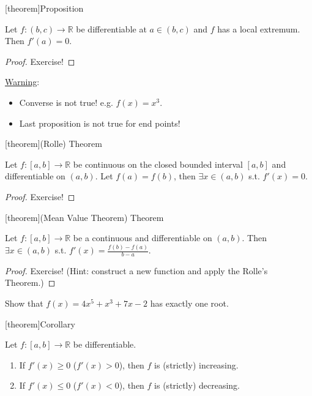 \documentclass[12pt]{report}
\theoremstyle{definition}
\begin{document}
[theorem]{Proposition}
\begin{local extremum differentiated to be 0}
    Let $f:(b,c)\rightarrow{}\mathbb{R}$ be differentiable at $a\in(b,c)$ and 
    $f$ has a local extremum. Then $f'(a) = 0$.
\end{local extremum differentiated to be 0}

\begin{proof}
    Exercise!
\end{proof}

\underline{Warning}:
\begin{itemize}
        \item Converse is not true! e.g. $f(x) = x^{3}$.
        \item Last proposition is not true for end points!
\end{itemize}

[theorem]{(Rolle) Theorem}
\begin{Rolle theorem}
    Let $f:[a,b]\rightarrow{}\mathbb{R}$ be continuous on the closed bounded interval $[a,b]$
    and differentiable on $(a,b)$. Let $f(a) = f(b)$, then $\exists x \in (a,b)$ s.t. $f'(x) = 0$.
\end{Rolle theorem}

\begin{proof}
    Exercise!
\end{proof}

[theorem]{(Mean Value Theorem) Theorem}
\begin{mean value theorem}
    Let $f:[a,b]\rightarrow{}\mathbb{R}$ be a continuous and differentiable on $(a,b)$.
    Then $\exists x \in (a,b)$ s.t. $f'(x) = \frac{f(b)-f(a)}{b-a}$.
\end{mean value theorem}

\begin{proof}
    Exercise! (Hint: construct a new function and apply the Rolle's Theorem.)
\end{proof}

\begin{ex}
    Show that $f(x) = 4x^{5} + x^{3} + 7x - 2$ has exactly one root.
\end{ex}

[theorem]{Corollary}
\begin{strictly increasing or decreasing definition}
    Let $f:[a,b]\rightarrow{}\mathbb{R}$ be differentiable.
    \begin{enumerate}
        \item If $f'(x)\ge 0$ ($f'(x)>0$), then $f$ is (strictly) increasing.
        \item If $f'(x)\le 0$ ($f'(x)<0$), then $f$ is (strictly) decreasing.
    \end{enumerate}
\end{strictly increasing or decreasing definition}
\end{document}
